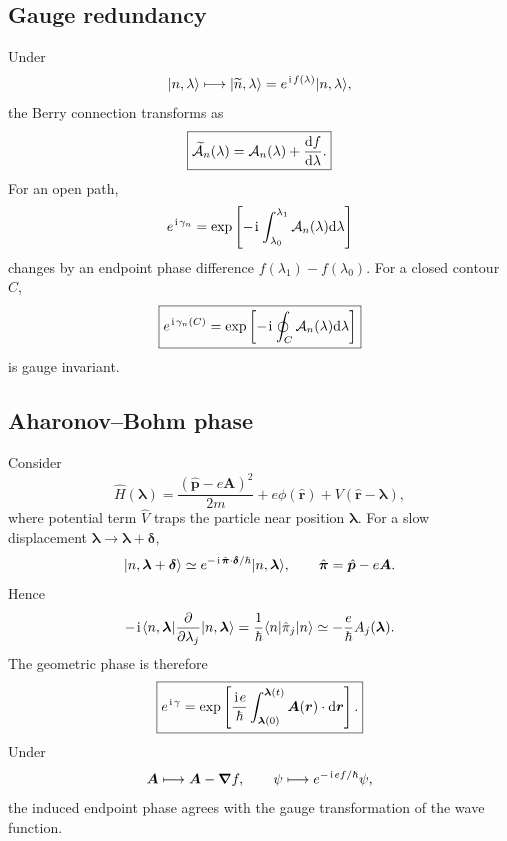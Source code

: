 \subsection{Gauge redundancy}
Under
\begin{equation}
 |{n,\lambda}\rangle
 \longmapsto
 |{\widetilde n,\lambda}\rangle
 =e^{\hspace{1pt}\mathrm{i}\hspace{1pt} f(\lambda)}|{n,\lambda}\rangle,
\end{equation}
the Berry connection transforms as
\begin{equation}
 \boxed{
 \widetilde{\mathcal A}_n(\lambda)
 =\mathcal A_n(\lambda)+\frac{\mathrm{d} f}{\mathrm{d}\lambda}.}
\end{equation}
For an open path,
\begin{equation}
 e^{\hspace{1pt}\mathrm{i}\hspace{1pt}\gamma_n}
 =\exp\left[-\hspace{1pt}\mathrm{i}\hspace{1pt}\int_{\lambda_0}^{\lambda_1}
 \mathcal A_n(\lambda)\mathrm{d}\lambda\right]
\end{equation}
changes by an endpoint phase difference $f(\lambda_1)-f(\lambda_0)$. For a closed contour $C$,
\begin{equation}
 \boxed{
 e^{\hspace{1pt}\mathrm{i}\hspace{1pt}\gamma_n(C)}
 =\exp\left[-\hspace{1pt}\mathrm{i}\hspace{1pt}\oint_C
 \mathcal A_n(\lambda)\mathrm{d}\lambda\right]}
\end{equation}
is gauge invariant.

\subsection{Aharonov--Bohm phase}

Consider
\begin{equation}
 \hat H(\bm\lambda)
 =\frac{(\hat{\bm p}-e\bm A)^2}{2m}
 +e\phi(\hat{\bm r})
 +V(\hat{\bm r}-\bm\lambda),
\end{equation}
where potential term $\hat V$ traps the particle near position $\bm\lambda$. For a slow displacement
$\bm\lambda\to\bm\lambda+\bm\delta$,
\begin{equation}
 |{n,\bm\lambda+\bm\delta}\rangle
 \simeq
 e^{-\hspace{1pt}\mathrm{i}\hspace{1pt}\hat{\bm\pi}\cdot\bm\delta/\hbar}
 |{n,\bm\lambda}\rangle,
 \qquad
 \hat{\bm\pi}=\hat{\bm p}-e\bm A.
\end{equation}
Hence
\begin{equation}
 -\hspace{1pt}\mathrm{i}\hspace{1pt}\langle{n,\bm\lambda}|
 \frac{\partial}{\partial\lambda_j}
 |{n,\bm\lambda}\rangle
 =\frac1\hbar\langle{n}|\hat\pi_j|{n}\rangle
 \simeq-\frac{e}{\hbar}A_j(\bm\lambda).
\end{equation}
The geometric phase is therefore
\begin{equation}
 \boxed{
 e^{\hspace{1pt}\mathrm{i}\hspace{1pt}\gamma}
 =\exp\left[
 \frac{\hspace{1pt}\mathrm{i}\hspace{1pt} e}{\hbar}
 \int_{\bm\lambda(0)}^{\bm\lambda(t)}
 \bm A(\bm r)\cdot\mathrm{d}\bm r\right].}
\end{equation}
Under
\begin{equation}
 \bm A\longmapsto\bm A-\bm\nabla f,
 \qquad
 \psi\longmapsto e^{-\hspace{1pt}\mathrm{i}\hspace{1pt} ef/\hbar}\psi,
\end{equation}
the induced endpoint phase agrees with the gauge transformation of the wave
function.


